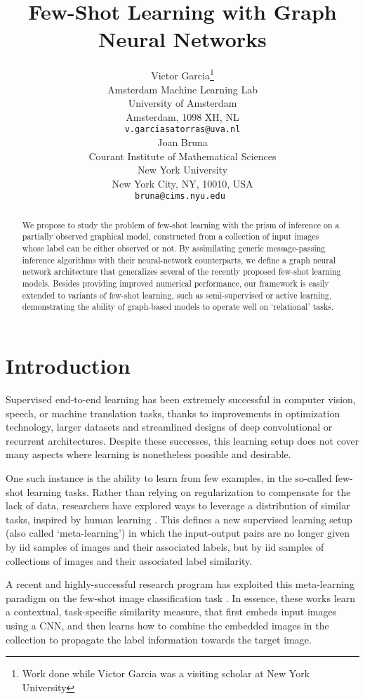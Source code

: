 \documentclass{article} \usepackage{iclr2018_conference,times}
\title{Few-Shot Learning with Graph Neural Networks}
\author{Victor Garcia\thanks{Work done while Victor Garcia was a visiting scholar at New York University} 
\\
Amsterdam Machine Learning Lab \\University of Amsterdam \\
Amsterdam, 1098 XH, NL\\
\texttt{v.garciasatorras@uva.nl} \\
\And
Joan Bruna \\
Courant Institute of Mathematical Sciences \\New York University \\
New York City, NY, 10010, USA\\
\texttt{bruna@cims.nyu.edu } \\
}
\begin{document}
\maketitle

\begin{abstract}
We propose to study the problem of few-shot learning with the prism of 
inference on a partially observed graphical model, constructed from a collection 
of input images whose label can be either observed or not. By assimilating 
generic message-passing inference algorithms with their neural-network counterparts, 
we define a graph neural network architecture that generalizes several of the 
recently proposed few-shot learning models. 
Besides providing improved numerical performance, our framework is 
easily extended to variants of few-shot learning, such as semi-supervised 
or active learning, demonstrating the ability of graph-based models to 
operate well on `relational' tasks. 
\end{abstract}


\section{Introduction}



Supervised end-to-end learning has been extremely successful in computer vision, speech, or machine translation tasks, 
thanks to improvements in optimization technology, larger datasets and streamlined designs of deep convolutional or recurrent architectures. Despite these successes, this learning setup does not cover many aspects where learning is nonetheless possible and desirable. 

One such instance is the ability to learn from few examples, in the so-called few-shot learning tasks. 
Rather than relying on regularization to compensate for the lack of data, researchers have explored 
ways to leverage a distribution of similar tasks, inspired by human learning \cite{lake2015human}. 
This defines a new supervised learning setup (also called `meta-learning') in which the input-output 
pairs are no longer given by iid samples of images and their associated labels, but by iid samples of 
collections of images and their associated label similarity. 

A recent and highly-successful research program has exploited this meta-learning paradigm 
on the few-shot image classification task \cite{lake2015human, koch2015siamese, vinyals2016matching, mishra2017meta, snell2017prototypical}. In essence, these works learn a contextual, task-specific similarity measure, 
that first embeds input images using a CNN, and then learns how to combine the embedded images in the 
collection to propagate the label information towards the target image. 
\end{document}

